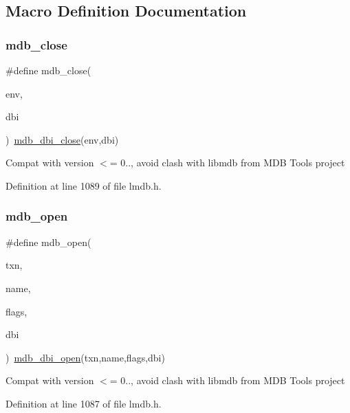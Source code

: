 \subsection{Macro Definition Documentation}
\mbox{\label{group__mdb_gac56dd5b9c0cecaee35d3d6719939212a}} 
\subsubsection{\texorpdfstring{mdb\+\_\+close}{mdb\_close}}
{\footnotesize\ttfamily \#define mdb\+\_\+close(\begin{DoxyParamCaption}\item[{}]{env,  }\item[{}]{dbi }\end{DoxyParamCaption})~\mbox{\hyperlink{group__internal_ga52dd98d0c542378370cd6b712ff961b5}{mdb\+\_\+dbi\+\_\+close}}(env,dbi)}

Compat with version $<$= 0.., avoid clash with libmdb from M\+DB Tools project 

Definition at line 1089 of file lmdb.\+h.

\mbox{\label{group__mdb_gab69d2d8eea05c0eb11cdb7a1916727bd}} 
\subsubsection{\texorpdfstring{mdb\+\_\+open}{mdb\_open}}
{\footnotesize\ttfamily \#define mdb\+\_\+open(\begin{DoxyParamCaption}\item[{}]{txn,  }\item[{}]{name,  }\item[{}]{flags,  }\item[{}]{dbi }\end{DoxyParamCaption})~\mbox{\hyperlink{group__internal_gac08cad5b096925642ca359a6d6f0562a}{mdb\+\_\+dbi\+\_\+open}}(txn,name,flags,dbi)}

Compat with version $<$= 0.., avoid clash with libmdb from M\+DB Tools project 

Definition at line 1087 of file lmdb.\+h.



